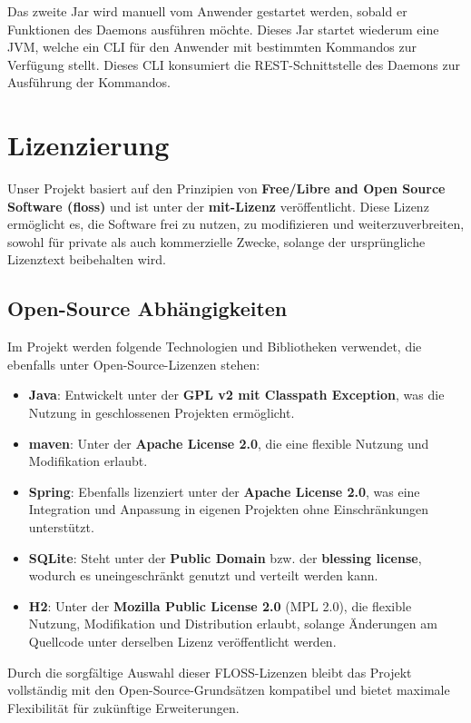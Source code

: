 \documentclass[a4paper,12pt]{report}
\begin{document}
    Das zweite Jar wird manuell vom Anwender gestartet werden, sobald er Funktionen des Daemons ausführen möchte.
    Dieses Jar startet wiederum eine JVM, welche ein CLI für den Anwender mit bestimmten Kommandos zur Verfügung stellt.
    Dieses CLI konsumiert die REST-Schnittstelle des Daemons zur Ausführung der Kommandos.


    \section{Lizenzierung}
    Unser Projekt basiert auf den Prinzipien von \textbf{Free/Libre and Open Source Software (\gls{floss})} und ist unter der \textbf{\gls{mit}-Lizenz} veröffentlicht.
    Diese Lizenz ermöglicht es, die Software frei zu nutzen, zu modifizieren und weiterzuverbreiten, sowohl für private als auch kommerzielle Zwecke, solange der ursprüngliche Lizenztext beibehalten wird.

    \subsection{Open-Source Abhängigkeiten}
    Im Projekt werden folgende Technologien und Bibliotheken verwendet, die ebenfalls unter Open-Source-Lizenzen stehen:

    \begin{itemize}
        \item \textbf{Java}: Entwickelt unter der \textbf{GPL v2 mit Classpath Exception}, was die Nutzung in geschlossenen Projekten ermöglicht.
        \item \textbf{\gls{maven}}: Unter der \textbf{Apache License 2.0}, die eine flexible Nutzung und Modifikation erlaubt.
        \item \textbf{Spring}: Ebenfalls lizenziert unter der \textbf{Apache License 2.0}, was eine Integration und Anpassung in eigenen Projekten ohne Einschränkungen unterstützt.
        \item \textbf{SQLite}: Steht unter der \textbf{Public Domain} bzw. der \textbf{blessing license}, wodurch es uneingeschränkt genutzt und verteilt werden kann.
        \item \textbf{H2}: Unter der \textbf{Mozilla Public License 2.0} (MPL 2.0), die flexible Nutzung, Modifikation und Distribution erlaubt, solange Änderungen am Quellcode unter derselben Lizenz veröffentlicht werden.
    \end{itemize}

    Durch die sorgfältige Auswahl dieser FLOSS-Lizenzen bleibt das Projekt vollständig mit den Open-Source-Grundsätzen kompatibel und bietet maximale Flexibilität für zukünftige Erweiterungen.
\end{document}
